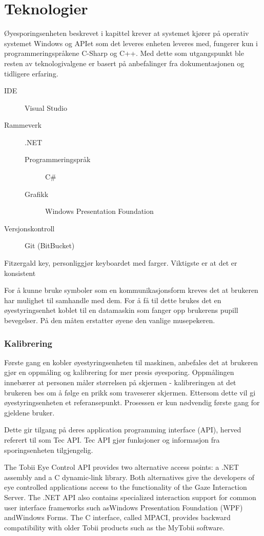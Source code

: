 \section{Teknologier}

Øyesporingsenheten beskrevet i kapittel  krever at systemet kjører på operativ systemet Windows og APIet som det leveres enheten leveres med,  fungerer kun i programmeringspråkene C-Sharp og C++. Med dette som utgangspunkt ble resten av teknologivalgene er basert på anbefalinger fra dokumentasjonen og tidligere erfaring. 


\begin{description}
  \item[IDE] Visual Studio
  \item[Rammeverk] .NET
  \begin{description}
     \item[Programmeringspråk] C\#
     \item[Grafikk] Windows Presentation Foundation 
\end{description}
  \item[Versjonskontroll] Git (BitBucket)
\end{description}


Fitzergald key, personliggjør keyboardet med farger. Viktigste er at det er konsistent


For å kunne bruke symboler som en kommunikasjonsform kreves det at brukeren har mulighet til samhandle med dem. For å få til dette brukes det en øyestyringsenhet koblet til en datamaskin som fanger opp brukerens pupill bevegelser. På den måten erstatter øyene den vanlige musepekeren.

\subsubsection{Kalibrering}

Første gang en kobler øyestyringsenheten til maskinen, anbefales det at brukeren gjør en oppmåling og kalibrering for mer presis øyesporing. Oppmålingen innebærer at personen måler størrelsen på skjermen - kalibreringen at det brukeren bes om å følge en prikk som traveserer skjermen. Ettersom dette vil gi øyestyringsenheten et referansepunkt. Prosessen er kun nødvendig første gang for gjeldene bruker. 

Dette gir tilgang på deres application programming interface (API), herved referert til som Tec API. Tec API gjør funksjoner og informasjon fra sporingsenheten tilgjengelig. 


The Tobii Eye Control API provides two alternative access points: a .NET assembly and a C dynamic-link library. Both alternatives
give the developers of eye controlled applications access to the functionality of the Gaze Interaction Server. The .NET API also
contains specialized interaction support for common user interface frameworks such asWindows Presentation Foundation
(WPF) andWindows Forms. The C interface, called MPACI, provides backward compatibility with older Tobii products such as
the MyTobii software.



